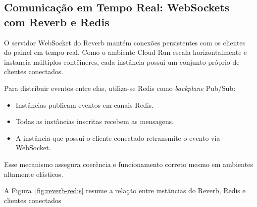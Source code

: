 \subsection{Comunicação em Tempo Real: WebSockets com Reverb e Redis}

O servidor WebSocket do Reverb mantém conexões persistentes com os clientes do painel
em tempo real. Como o ambiente Cloud Run escala horizontalmente e instancia múltiplos
contêineres, cada instância possui um conjunto próprio de clientes conectados.

Para distribuir eventos entre elas, utiliza-se Redis como \textit{backplane} Pub/Sub:

\begin{itemize}
    \item Instâncias publicam eventos em canais Redis.
    \item Todas as instâncias inscritas recebem as mensagens.
    \item A instância que possui o cliente conectado retransmite o evento via WebSocket.
\end{itemize}

Esse mecanismo assegura coerência e funcionamento correto mesmo em ambientes altamente elásticos.

A Figura~\ref{fig:reverb-redis} resume a relação entre instâncias do Reverb, Redis
e clientes conectados

